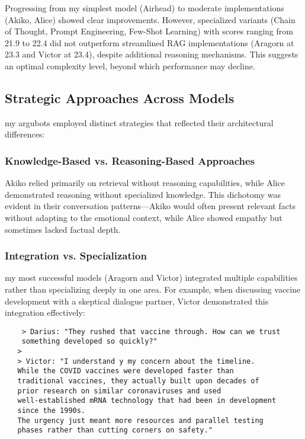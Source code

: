 \documentclass[11pt]{article}
\begin{document}
Progressing from  my simplest model (Airhead) to moderate implementations (Akiko, Alice) showed clear improvements. However, specialized variants (Chain of Thought, Prompt Engineering, Few-Shot Learning) with scores ranging from 21.9 to 22.4 did not outperform streamlined RAG implementations (Aragorn at 23.3 and Victor at 23.4), despite additional reasoning mechanisms. This suggests an optimal complexity level, beyond which performance may decline.

\subsection{Strategic Approaches Across Models}

 my argubots employed distinct strategies that reflected their architectural differences:

\subsubsection{Knowledge-Based vs. Reasoning-Based Approaches} 
Akiko relied primarily on retrieval without reasoning capabilities, while Alice demonstrated reasoning without specialized knowledge. This dichotomy was evident in their conversation patterns—Akiko would often present relevant facts without adapting to the emotional context, while Alice showed empathy but sometimes lacked factual depth.

\subsubsection{Integration vs. Specialization} 
 my most successful models (Aragorn and Victor) integrated multiple capabilities rather than specializing deeply in one area. For example, when discussing vaccine development with a skeptical dialogue partner, Victor demonstrated this integration effectively:
\begin{verbatim}
    > Darius: "They rushed that vaccine through. How can we trust 
    something developed so quickly?"
   > 
   > Victor: "I understand y my concern about the timeline. 
   While the COVID vaccines were developed faster than 
   traditional vaccines, they actually built upon decades of 
   prior research on similar coronaviruses and used 
   well-established mRNA technology that had been in development 
   since the 1990s.
   The urgency just meant more resources and parallel testing 
   phases rather than cutting corners on safety."
\end{verbatim}
\end{document}
